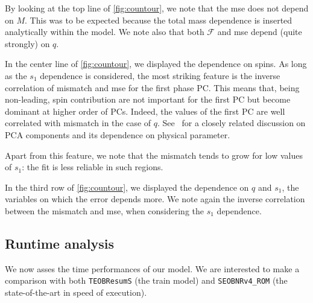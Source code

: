 \par
By looking at the top line of \ref{fig:countour}, we note that the mse does not depend on $M$. This was to be expected because the total mass dependence is inserted analytically within the model.
We note also that both $\mathcal{F}$ and mse depend (quite strongly) on $q$.
\par
In the center line of \ref{fig:countour}, we displayed the dependence on spins.
As long as the $s_1$ dependence is considered, the most striking feature is the inverse correlation of mismatch and mse for the first phase PC.
This means that, being non-leading, spin contribution are not important for the first PC but become dominant at higher order of PCs.
Indeed, the values of the first PC are well correlated with mismatch in the case of $q$. See~\cite{Ohme2013PCA_GW} for a closely related discussion on PCA components and its dependence on physical parameter.
\par
Apart from this feature, we note that the mismatch tends to grow for low values of $s_1$: the fit is less reliable in such regions.
\par
In the third row of \ref{fig:countour}, we displayed the dependence on $q$ and $s_1$, the variables on which the error depends more.
We note again the inverse correlation between the mismatch and mse, when considering the $s_1$ dependence.
\subsection{Runtime analysis} \label{sec:runtime}
We now asses the time performances of our model.
We are interested to make a comparison with both \texttt{TEOBResumS}
(the train model) and \texttt{SEOBNRv4\_ROM} \cite{} (the
state-of-the-art in speed of execution).
%

